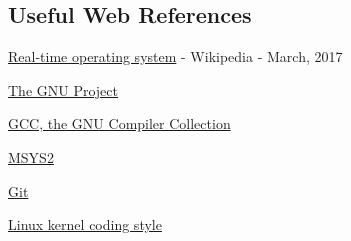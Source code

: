 \subsection{Useful Web References}

\begin{flushleft}
\href{https://en.wikipedia.org/wiki/Real-time_operating_system}{Real-time operating system} - Wikipedia - March, 2017
\end{flushleft}

\begin{flushleft}
\href{https://www.gnu.org/gnu/thegnuproject.en.html}{The GNU Project}\\
\end{flushleft}

\begin{flushleft}
\href{https://gcc.gnu.org/}{GCC, the GNU Compiler Collection}\\
\end{flushleft}

\begin{flushleft}
\href{https://github.com/msys2/msys2/wiki}{MSYS2}\\
\end{flushleft}

\begin{flushleft}
\href{https://git-scm.com/downloads}{Git}\\
\end{flushleft}

\begin{flushleft}
\href{https://www.kernel.org/doc/html/v4.10/process/coding-style.html}{Linux kernel coding style}\\
\end{flushleft}




